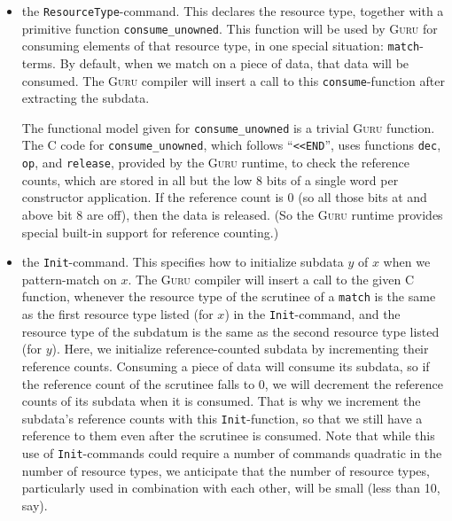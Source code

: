 \documentclass[9pt,natbib]{sigplanconf}
\begin{document}
\begin{itemize}
\item the \texttt{ResourceType}-command.  This declares the resource
  type, together with a primitive function \texttt{consume\_unowned}.
  This function will be used by \textsc{Guru} for consuming
  elements of that resource type, in one special situation:
  \texttt{match}-terms.  By default, when we match on a piece of data,
  that data will be consumed.  The \textsc{Guru} compiler will insert
  a call to this \texttt{consume}-function after extracting the
  subdata.

  The functional model given for \texttt{consume\_unowned} is a
  trivial \textsc{Guru} function.  The C code for
  \texttt{consume\_unowned}, which follows ``\texttt{<<END}'', uses
  functions \texttt{dec}, \texttt{op}, and \texttt{release}, provided
  by the \textsc{Guru} runtime, to check the reference counts, which
  are stored in all but the low 8 bits of a single word per
  constructor application.  If the reference count is 0 (so all those
  bits at and above bit 8 are off), then the data is released.  (So
  the \textsc{Guru} runtime provides special built-in support for
  reference counting.)

\item the \texttt{Init}-command.  This specifies how to initialize
  subdata $y$ of $x$ when we pattern-match on $x$.  The \textsc{Guru}
  compiler will insert a call to the given C function, whenever the
  resource type of the scrutinee of a \texttt{match} is the same as
  the first resource type listed (for $x$) in the
  \texttt{Init}-command, and the resource type of the subdatum is the
  same as the second resource type listed (for $y$).  Here, we
  initialize reference-counted subdata by incrementing their reference
  counts.  Consuming a piece of data will consume its subdata, so if
  the reference count of the scrutinee falls to $0$, we will decrement
  the reference counts of its subdata when it is consumed.  That is
  why we increment the subdata's reference counts with this
  \texttt{Init}-function, so that we still have a reference to them
  even after the scrutinee is consumed.  Note that while this use of
  \texttt{Init}-commands could require a number of commands quadratic
  in the number of resource types, we anticipate that the number of
  resource types, particularly used in combination with each other,
  will be small (less than 10, say).
  

\end{itemize}
\end{document}
